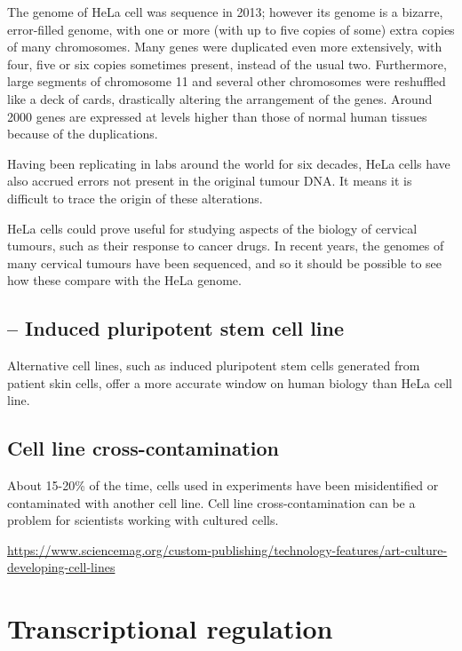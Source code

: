 The genome of HeLa cell was sequence in 2013; however its genome is a bizarre,
error-filled genome, with one or more (with up to five copies of some) extra
copies of many chromosomes. Many genes were duplicated even more extensively,
with four, five or six copies sometimes present, instead of the usual two. 
Furthermore, large segments of chromosome 11 and several other chromosomes were
reshuffled like a deck of cards, drastically altering the arrangement of the
genes.  Around 2000 genes are expressed at levels higher than those of normal
human tissues because of the duplications.

Having been replicating in labs around the world for six decades, HeLa cells
have also accrued errors not present in the original tumour DNA.  It means it is
difficult to trace the origin of these alterations.

HeLa cells could prove useful for studying aspects of the biology of cervical
tumours, such as their response to cancer drugs.
In recent years, the genomes of many cervical tumours have been sequenced, and
so it should be possible to see how these compare with the HeLa genome.

\subsection{-- Induced pluripotent stem cell line}
\label{sec:induced-pluripotenti-stem-cell-line}
\label{sec:cell-line-induced-pluripotenti-stem}

Alternative cell lines, such as induced pluripotent stem cells generated from
patient skin cells, offer a more accurate window on human biology than HeLa
cell line.



\subsection{Cell line cross-contamination}
 
About 15-20\% of the time, cells used in experiments have been misidentified or
contaminated with another cell line. Cell line cross-contamination can be a
problem for scientists working with cultured cells.

\url{https://www.sciencemag.org/custom-publishing/technology-features/art-culture-developing-cell-lines}


\section{Transcriptional regulation}
\label{sec:transcriptional-regulation}

